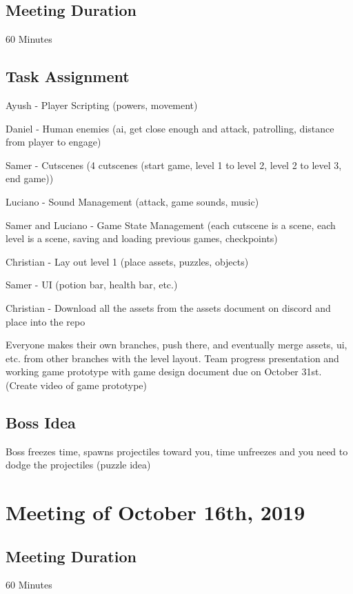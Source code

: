 \documentclass{article}
\begin{document}
\subsection{Meeting Duration}
60 Minutes

\subsection{Task Assignment}
\begin{description}
\item Ayush - Player Scripting (powers, movement)
\item Daniel - Human enemies (ai, get close enough and attack, patrolling, distance from player to engage)
\item Samer - Cutscenes (4 cutscenes (start game, level 1 to level 2, level 2 to level 3, end game))
\item Luciano - Sound Management (attack, game sounds, music)
\item Samer and Luciano - Game State Management (each cutscene is a scene, each level is a scene, saving and loading previous games, checkpoints)
\item Christian - Lay out level 1 (place assets, puzzles, objects)
\item Samer - UI (potion bar, health bar, etc.)
\item Christian - Download all the assets from the assets document on discord and place into the repo
\end{description}

Everyone makes their own branches, push there, and eventually merge assets, ui, etc. from other branches with the level layout. Team progress presentation and working game prototype with game design document due on October 31st. (Create video of game prototype)

\subsection{Boss Idea}
Boss freezes time, spawns projectiles toward you, time unfreezes and you need to dodge the projectiles (puzzle idea)




\section{Meeting of October 16th, 2019}

\subsection{Meeting Duration}
60 Minutes
\end{document}
